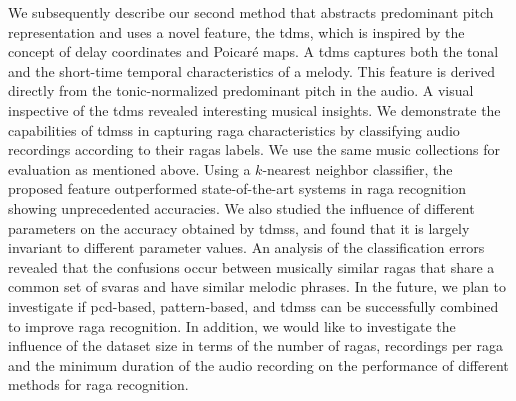 We subsequently describe our second method that abstracts predominant pitch representation and uses a novel feature, the \acrshort{tdms}, which is inspired by the concept of delay coordinates and Poicar\'e maps. A \gls{tdms} captures both the tonal and the short-time temporal characteristics of a melody. This feature is derived directly from the tonic-normalized predominant pitch in the audio. A visual inspective of the \acrshort{tdms} revealed interesting musical insights. We demonstrate the capabilities of \glspl{tdms} in capturing \gls{raga} characteristics by classifying audio recordings according to their \glspl{raga} labels. We use the same music collections for evaluation as mentioned above. Using a $k$-nearest neighbor classifier, the proposed feature outperformed state-of-the-art systems in \gls{raga} recognition showing unprecedented accuracies. We also studied the influence of different parameters on the accuracy obtained by \glspl{tdms}, and found that it is largely invariant to different parameter values. An analysis of the classification errors revealed that the confusions occur between musically similar \glspl{raga} that share a common set of \glspl{svara} and have similar melodic phrases. In the future, we plan to investigate if \gls{pcd}-based, pattern-based, and \glspl{tdms} can be successfully combined to improve \gls{raga} recognition. In addition, we would like to investigate the influence of the dataset size in terms of the number of \glspl{raga}, recordings per \gls{raga} and the minimum duration of the audio recording on the performance of different methods for \gls{raga} recognition.











